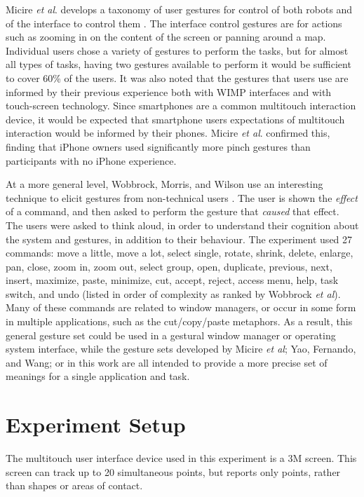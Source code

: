 \documentclass[]{article}
\begin{document}
Micire \textit{et al}. develops a taxonomy of user gestures for control of both robots and of the interface to control them \cite{Micire:2009:ANG:1731903.1731912}. 
The interface control gestures are for actions such as zooming in on the content of the screen or panning around a map. 
Individual users chose a variety of gestures to perform the tasks, but for almost all types of tasks, having two gestures available to perform it would be sufficient to cover 60\% of the users. 
It was also noted that the gestures that users use are informed by their previous experience both with WIMP interfaces and with touch-screen technology. 
Since smartphones are a common multitouch interaction device, it would be expected that smartphone users expectations of multitouch interaction would be informed by their phones. 
Micire \textit{et al}. confirmed this, finding that iPhone owners used significantly more pinch gestures than participants with no iPhone experience. 

At a more general level, Wobbrock, Morris, and Wilson use an interesting technique to elicit gestures from non-technical users \cite{wobbrock2009user}.
The user is shown the \textit{effect} of a command, and then asked to perform the gesture that \textit{caused} that effect. 
The users were asked to think aloud, in order to understand their cognition about the system and gestures, in addition to their behaviour. 
The experiment used 27 commands: move a little, move a lot, select single, rotate, shrink, delete, enlarge, pan, close, zoom in, zoom out, select group, open, duplicate, previous, next, insert, maximize, paste, minimize, cut, accept, reject, access menu, help, task switch, and undo (listed in order of complexity as ranked by Wobbrock \textit{et al}).
Many of these commands are related to window managers, or occur in some form in multiple applications, such as the cut/copy/paste metaphors. 
As a result, this general gesture set could be used in a gestural window manager or operating system interface, while the gesture sets developed by Micire \textit{et al}; Yao, Fernando, and Wang; or in this work are all intended to provide a more precise set of meanings for a single application and task. 

\section{Experiment Setup}


The multitouch user interface device used in this experiment is a 3M  screen. 
This screen can track up to 20 simultaneous points, but reports only points, rather than shapes or areas of contact. 
\end{document}
